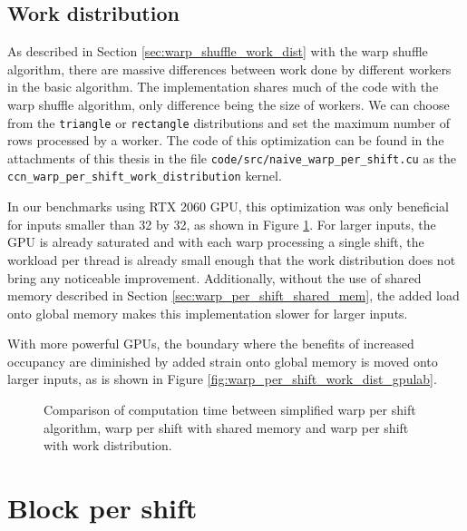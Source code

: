 \subsection{Work distribution}

As described in Section \ref{sec:warp_shuffle_work_dist} with the warp shuffle algorithm, there are massive differences between work done by different workers in the basic algorithm. The implementation shares much of the code with the warp shuffle algorithm, only difference being the size of workers. We can choose from the \texttt{triangle} or \texttt{rectangle} distributions and set the maximum number of rows processed by a worker. The code of this optimization can be found in the attachments of this thesis in the file \texttt{code/src/naive\_warp\_per\_shift.cu} as the \texttt{ccn\_warp\_per\_shift\_work\_distribution} kernel.

In our benchmarks using RTX 2060 GPU, this optimization was only beneficial for inputs smaller than 32 by 32, as shown in Figure \ref{fig:warp_per_shift_work_dist_local_results}. For larger inputs, the GPU is already saturated and with each warp processing a single shift, the workload per thread is already small enough that the work distribution does not bring any noticeable improvement. Additionally, without the use of shared memory described in Section \ref{sec:warp_per_shift_shared_mem}, the added load onto global memory makes this implementation slower for larger inputs.

With more powerful GPUs, the boundary where the benefits of increased occupancy are diminished by added strain onto global memory is moved onto larger inputs, as is shown in Figure \ref{fig:warp_per_shift_work_dist_gpulab}. %


\begin{figure}[ht]
	\centering
	\def\svgwidth{0.4\textwidth}
	
	\caption{Comparison of computation time between simplified warp per shift algorithm, warp per shift with shared memory and warp per shift with work distribution.}
	\label{fig:warp_per_shift_work_dist_local_results}
\end{figure}



\section{Block per shift}
\label{sec:block_per_shift}

